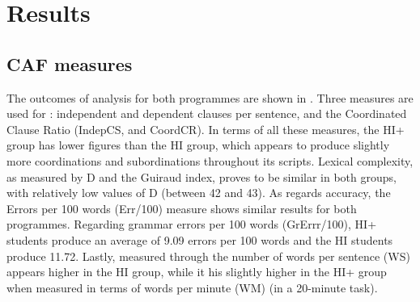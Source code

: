 \documentclass[output=paper]{langsci/langscibook}
\begin{document}
\section{Results}

\subsection{CAF measures}

The outcomes of  analysis for both programmes are shown in . Three measures are used for : independent and dependent clauses per sentence, and the Coordinated Clause Ratio (IndepCS,  and CoordCR). In terms of all these measures, the HI+ group has lower figures than the HI group, which appears to produce slightly more coordinations and subordinations throughout its scripts. Lexical complexity, as measured by D and the Guiraud index, proves to be similar in both groups, with relatively low values of D (between 42 and 43). As regards accuracy, the Errors per 100 words (Err/100) measure shows similar results for both programmes. Regarding grammar errors per 100 words (GrErrr/100), HI+ students produce an average of 9.09 errors per 100 words and the HI students produce 11.72.  Lastly,  measured through the number of words per sentence (WS)  appears  higher in the HI group, while it his slightly higher in the HI+ group when measured in terms of words per minute (WM) (in a 20-minute task). 
\end{document}
